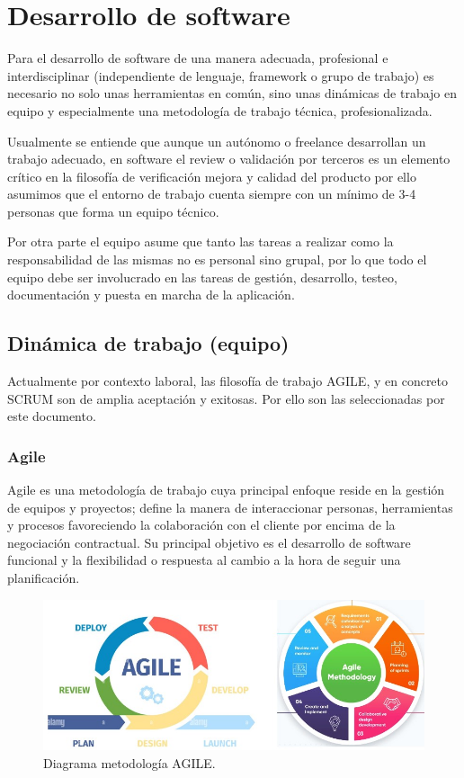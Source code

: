 \chapter{Desarrollo de software}\label{S:tema_4}
Para el desarrollo de software de una manera adecuada, profesional e interdisciplinar (independiente de lenguaje, framework o grupo de trabajo) es necesario no solo unas herramientas en común, sino unas dinámicas de trabajo en equipo y especialmente una metodología de trabajo técnica, profesionalizada.

Usualmente se entiende que aunque un autónomo o freelance desarrollan un trabajo adecuado, en software el review o validación por terceros es un elemento crítico en la filosofía de verificación mejora y calidad del producto por ello asumimos que el entorno de trabajo cuenta siempre con un mínimo de 3-4 personas que forma un equipo técnico.

Por otra parte el equipo asume que tanto las tareas a realizar como la responsabilidad de las mismas no es personal sino grupal, por lo que todo el equipo debe ser involucrado en las tareas de gestión, desarrollo, testeo, documentación y puesta en marcha de la aplicación.

\section{Dinámica de trabajo (equipo)}
Actualmente por contexto laboral, las filosofía de trabajo AGILE\cite{c_agile}, y en concreto SCRUM\cite{c_scrum} son de amplia aceptación y exitosas. Por ello son las seleccionadas por este documento.

\subsection{Agile}
Agile es una metodología de trabajo cuya principal enfoque reside en la gestión de equipos y proyectos; define la manera de interaccionar personas, herramientas y procesos favoreciendo la colaboración con el cliente por encima de la negociación contractual. Su principal objetivo es el desarrollo de software funcional y la flexibilidad o respuesta al cambio a la hora de seguir una planificación.

\begin{figure}[!htb]
\begin{center}
\includegraphics[width=1\textwidth]{./figuras/agile}
\caption{Diagrama metodología AGILE.}
\label{F:agile}
\end{center}
\end{figure}

